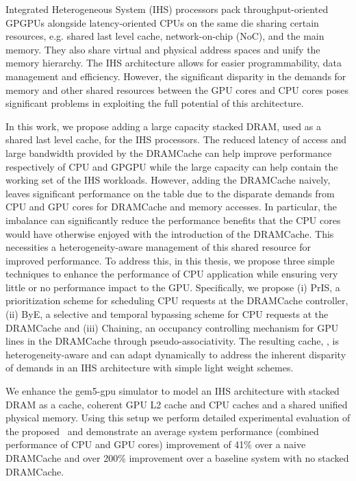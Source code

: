 \par Integrated Heterogeneous System (IHS) processors pack throughput-oriented GPGPUs alongside latency-oriented CPUs on the same die sharing certain resources, e.g. shared last level cache, network-on-chip (NoC), and the main memory. They also share virtual and physical address spaces and unify the memory hierarchy. The IHS architecture allows for easier programmability, data management and efficiency. However, the significant disparity in the demands for memory and other shared resources between the GPU cores and CPU cores poses significant problems in exploiting the full potential of this architecture.
\par In this work, we propose adding a large capacity stacked DRAM, used as a shared last level cache, for the IHS processors. The reduced latency of access and large bandwidth provided by the DRAMCache can help improve performance respectively of CPU and GPGPU while the large capacity can help contain the working set of the IHS workloads. However, adding the DRAMCache naively, leaves significant performance on the table due to the disparate demands from CPU and GPU cores for DRAMCache and memory accesses. 
In particular, the imbalance can significantly reduce the performance benefits that the CPU cores would have otherwise enjoyed with the introduction of the DRAMCache. This necessities a heterogeneity-aware management of this shared resource for improved performance. To address this, in this thesis, we propose three simple techniques to enhance the performance of CPU application while ensuring very little or no performance impact to the GPU. Specifically, we propose (i) PrIS, a prioritization scheme for scheduling CPU
requests at the DRAMCache controller, (ii) ByE, a selective and temporal bypassing scheme for CPU requests at the DRAMCache and (iii) Chaining, an occupancy controlling mechanism for GPU lines in the DRAMCache through pseudo-associativity. The resulting cache, \cachename, is heterogeneity-aware and can adapt dynamically to address the inherent disparity of demands in an IHS architecture with simple light weight schemes. 
\par We enhance the gem5-gpu simulator to model an IHS architecture with stacked DRAM as a cache, coherent GPU L2 cache and CPU caches and a shared unified physical memory. Using this setup we perform detailed experimental evaluation of the proposed \cachename\ and demonstrate an average system performance (combined performance of CPU  and GPU cores) improvement of 41\% over a naive DRAMCache and over 200\% improvement over a baseline system with no stacked DRAMCache.
